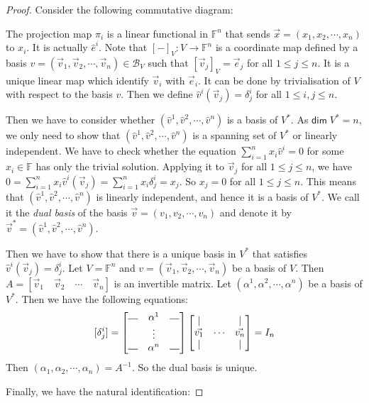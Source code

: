 \documentclass[
	11pt, %
	fleqn, %
	a4paper, %
]{LegrandOrangeBook}
\newcommand{\F}{\mathbb{F}} %
\newcommand{\B}{\mathcal{B}} %
\renewcommand{\dim}{\mathsf{dim\;}} %
\newcommand{\hdash}{\rotatebox{90}{$|$}}
\begin{document}
\begin{proof}
Consider the following commutative diagram:
\begin{center}
\end{center}
The projection map $\pi_i$ is a linear functional in $\F^n$ that sends $\vec{x} = (x_1, x_2, \cdots, x_n)$ to $x_i$. It is actually $\hat{e}^i$. Note that $[-]_V : V \to \F^n$ is a coordinate map defined by a basis $v = (\vec{v}_1, \vec{v}_2, \cdots, \vec{v}_n) \in \B_V$ such that $[\vec{v}_j]_V = \vec{e}_j$ for all $1 \leq j \leq n$. It is a unique linear map which identify $\vec{v}_i$ with $\vec{e}_i$. It can be done by trivialisation of $V$ with respect to the basis $v$. Then we define $\hat{v}^i(\vec{v}_j) = \delta^i_j$ for all $1 \leq i, j \leq n$.

Then we have to consider whether $(\hat{v}^1, \hat{v}^2, \cdots, \hat{v}^n)$ is a basis of $V^*$. As $\dim{V^*} = n$, we only need to show that $(\hat{v}^1, \hat{v}^2, \cdots, \hat{v}^n)$ is a spanning set of $V^*$ or linearly independent. We have to check whether the equation $\sum_{i=1}^n x_i \hat{v}^i = 0$ for some $x_i \in \F$ has only the trivial solution. Applying it to $\vec{v}_j$ for all $1 \leq j \leq n$, we have $0 = \sum_{i=1}^n x_i \hat{v}^i(\vec{v}_j) = \sum_{i=1}^n x_i \delta_j^i = x_j$. So $x_j = 0$ for all $1 \leq j \leq n$. This means that $(\hat{v}^1, \hat{v}^2, \cdots, \hat{v}^n)$ is linearly independent, and hence it is a basis of $V^*$. We call it the \emph{dual basis} of the basis $\vec{v} = (v_1, v_2, \cdots, v_n)$ and denote it by $\vec{v}^* = (\hat{v}^1, \hat{v}^2, \cdots, \hat{v}^n)$. 

Then we have to show that there is a unique basis in $V^*$ that satisfies $\hat{v}^i(\vec{v}_j) = \delta^i_j$. Let $V = \F^n$ and $v = (\vec{v}_1, \vec{v}_2, \cdots, \vec{v}_n)$ be a basis of $V$. Then $A = [\vec{v}_1 \quad \vec{v}_2 \quad \cdots \quad \vec{v}_n]$ is an invertible matrix. Let $(\alpha^1, \alpha^2, \cdots, \alpha^n)$ be a basis of $V^*$. Then we have the following equations:
\[
    [ \delta^i_j ] = \begin{bmatrix}
        \hdash & \alpha^1 & \hdash \\
        & \vdots \\
        \hdash & \alpha^n & \hdash
    \end{bmatrix} \begin{bmatrix}
        | & & | \\
        \vec{v_1} & \cdots & \vec{v_n} \\
        | & & |
    \end{bmatrix} = I_n
\]
Then $(\alpha_1, \alpha_2, \cdots, \alpha_n) = A^{-1}$. So the dual basis is unique.

Finally, we have the natural identification:
\end{proof}
\end{document}
